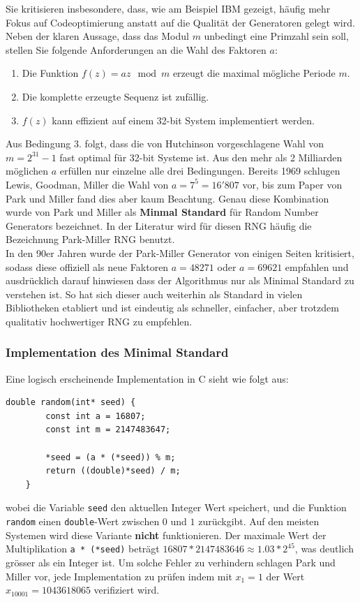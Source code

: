 \documentclass{book}
\begin{document}
\begin{refsection}
Sie kritisieren insbesondere, dass, wie am Beispiel IBM gezeigt, häufig mehr Fokus auf Codeoptimierung anstatt auf die Qualität der Generatoren gelegt wird. Neben der klaren Aussage, dass das Modul $m$ unbedingt eine Primzahl sein soll, stellen Sie folgende Anforderungen an die Wahl des Faktoren $a$:

\begin{enumerate}
	\item Die Funktion $f(z) = a z \mod m$ erzeugt die maximal mögliche Periode $m$.
	\item Die komplette erzeugte Sequenz ist zufällig.
	\item $f(z)$ kann effizient auf einem 32-bit System implementiert werden.
\end{enumerate}

Aus Bedingung 3. folgt, dass die von Hutchinson \cite{rng:Hutchinson1966} vorgeschlagene Wahl von $m = 2^{31} - 1$ fast optimal für 32-bit Systeme ist. Aus den mehr als 2 Milliarden möglichen $a$ erfüllen nur einzelne alle drei Bedingungen. Bereits 1969 schlugen Lewis, Goodman, Miller \cite{rng:LewisGoodmanMiller1969} die Wahl von $a = 7^5 = 16'807$ vor, bis zum Paper von Park und Miller fand dies aber kaum Beachtung. Genau diese Kombination wurde von Park und Miller als \textbf{Minmal Standard}  für Random Number Generators bezeichnet. In der Literatur wird für diesen RNG häufig die Bezeichnung Park-Miller RNG benutzt. \\

In den 90er Jahren wurde der Park-Miller Generator von einigen Seiten kritisiert, sodass diese offiziell als neue Faktoren $a = 48271$ oder $a = 69621$ empfahlen und ausdrücklich darauf hinwiesen dass der Algorithmus nur als Minimal Standard zu verstehen ist. So hat sich dieser auch weiterhin als Standard in vielen Bibliotheken etabliert und ist eindeutig als schneller, einfacher, aber trotzdem qualitativ hochwertiger RNG zu empfehlen.

\newpage
\subsubsection{Implementation des Minimal Standard}
Eine logisch erscheinende Implementation in C sieht wie folgt aus:
\begin{lstlisting}[style=C]
	double random(int* seed) {
		const int a = 16807;
		const int m = 2147483647;
		
		*seed = (a * (*seed)) % m;
		return ((double)*seed) / m;
	}
\end{lstlisting}
wobei die Variable \texttt{seed} den aktuellen Integer Wert speichert, und die Funktion \texttt{random} einen \texttt{double}-Wert zwischen $0$ und $1$ zurückgibt. Auf den meisten Systemen wird diese Variante \textbf{nicht} funktionieren. Der maximale Wert der Multiplikation \texttt{a * (*seed)} beträgt $16807*2147483646 \approx 1.03 * 2^{45}$, was deutlich grösser als ein Integer ist. Um solche Fehler zu verhindern schlagen Park und Miller vor, jede Implementation zu prüfen indem mit $x_1 = 1$ der Wert $x_{10001} = 1043618065$ verifiziert wird. \\


\end{refsection}
\end{document}
